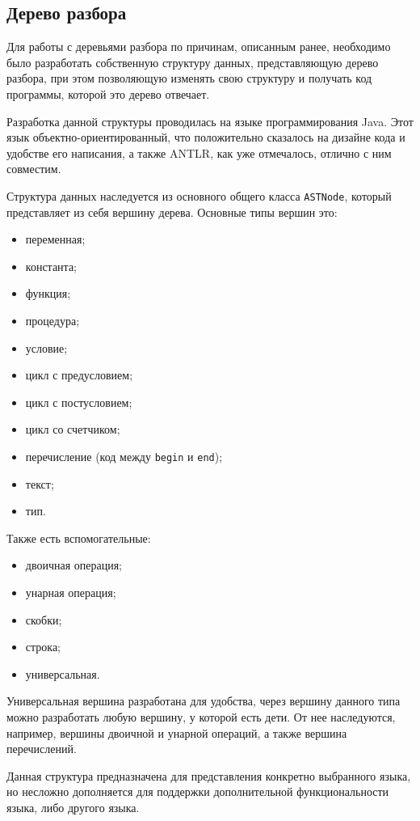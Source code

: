 \subsection{Дерево разбора}

Для работы с деревьями разбора по причинам, описанным ранее, необходимо было разработать собственную структуру данных, представляющую
дерево разбора, при этом позволяющую изменять свою структуру и получать код программы, которой это дерево отвечает.

Разработка данной структуры проводилась на языке программирования Java. Этот язык объектно-ориентированный, что положительно сказалось
на дизайне кода и удобстве его написания, а также ANTLR, как уже отмечалось, отлично с ним совместим.

Структура данных наследуется из основного общего класса \texttt{ASTNode}, который представляет из себя вершину дерева.
Основные типы вершин это:
\begin{itemize}
    \item переменная;
    \item константа;
    \item функция;
    \item процедура;
    \item условие;
    \item цикл с предусловием;
    \item цикл с постусловием; 
    \item цикл со счетчиком;
    \item перечисление (код между \texttt{begin} и \texttt{end});
    \item текст;
    \item тип.
\end{itemize}
Также есть вспомогательные:
\begin{itemize}
    \item двоичная операция;
    \item унарная операция;
    \item скобки;
    \item строка;
    \item универсальная.
\end{itemize}

Универсальная вершина разработана для удобства, через вершину данного типа можно разработать любую вершину, у которой есть дети.
От нее наследуются, например, вершины двоичной и унарной операций, а также вершина перечислений.  

Данная структура предназначена для представления конкретно выбранного языка, но несложно дополняется для поддержки дополнительной
функциональности языка, либо другого языка.

